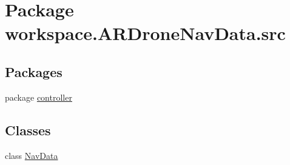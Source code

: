 \hypertarget{namespaceworkspace_1_1_a_r_drone_nav_data_1_1src}{}\section{Package workspace.\+A\+R\+Drone\+Nav\+Data.\+src}
\label{namespaceworkspace_1_1_a_r_drone_nav_data_1_1src}
\subsection*{Packages}
\begin{DoxyCompactItemize}
\item 
package \hyperlink{namespaceworkspace_1_1_a_r_drone_nav_data_1_1src_1_1controller}{controller}
\end{DoxyCompactItemize}
\subsection*{Classes}
\begin{DoxyCompactItemize}
\item 
class \hyperlink{classworkspace_1_1_a_r_drone_nav_data_1_1src_1_1_nav_data}{Nav\+Data}
\end{DoxyCompactItemize}
